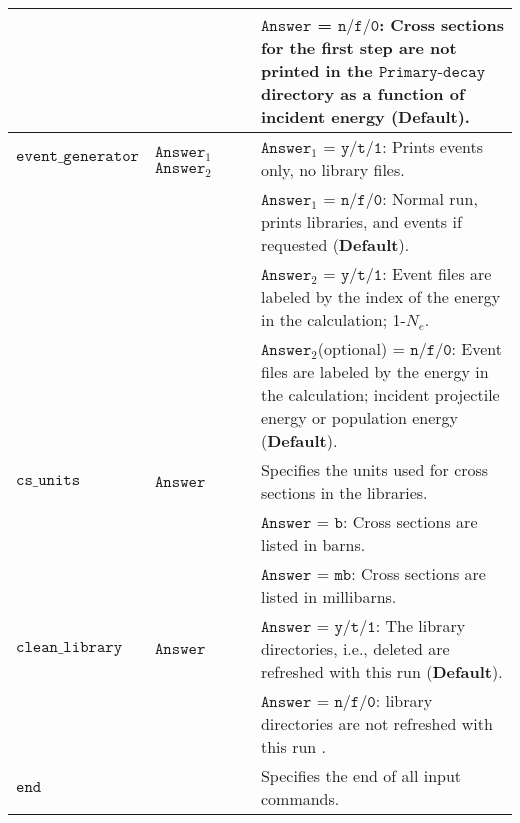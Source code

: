 \documentclass[
10pt,
showpacs,preprintnumbers,footinbib,
amsfonts,amsmath,amssymb,
aps,
prc,twocolumn,groupedaddress,superscriptaddress,
showkeys,
nofootinbib
]{revtex4-1}
\begin{document}
\begin{center}
\begin{tabular}{| p{4cm} | p{4cm} | p{9cm} |}
  &  &  ${\texttt{Answer}}$ = ${\texttt{n/f/0}}$: Cross sections for the first step are {\bf not} printed in the ${\texttt{Primary-decay}}$ directory as a function of incident energy ({\bf Default}). \\
\hline
${\texttt{event\_generator}}$ & ${\texttt{Answer}}_1$~~~${\texttt{Answer}}_2$ & ${\texttt{Answer}}_1$ = ${\texttt{y/t/1}}$: Prints events only, no library files. \\
   &    & ${\texttt{Answer}}_1$ = ${\texttt{n/f/0}}$: Normal run, prints libraries, and events if requested ({\bf Default}). \\
   &    & ${\texttt{Answer}}_2$ = ${\texttt{y/t/1}}$: Event files are labeled by the index of the energy in the calculation; 1-$N_e$. \\
   &    & ${\texttt{Answer}}_2$(optional) = ${\texttt{n/f/0}}$: Event files are labeled by the energy in the calculation; incident projectile energy or population energy ({\bf Default}). \\
\hline
${\texttt{cs\_units}}$ & ${\texttt{Answer}}$ & Specifies the units used for cross sections in the libraries.\\
& & ${\texttt{Answer}}$ = ${\texttt{b}}$: Cross sections are listed in barns.\\
& & ${\texttt{Answer}}$ = ${\texttt{mb}}$: Cross sections are listed in millibarns.\\
\hline
${\texttt{clean\_library}}$ & ${\texttt{Answer}}$ & ${\texttt{Answer}}$ = ${\texttt{y/t/1}}$: The library directories, i.e., deleted are refreshed with this run ({\bf Default}). \\
  &  &  ${\texttt{Answer}}$ = ${\texttt{n/f/0}}$: library directories are not refreshed with this run . \\
\hline
${\texttt{end}}$ & & Specifies the end of all input commands.\\
\hline
\end{tabular}
\end{center}
\end{document}
